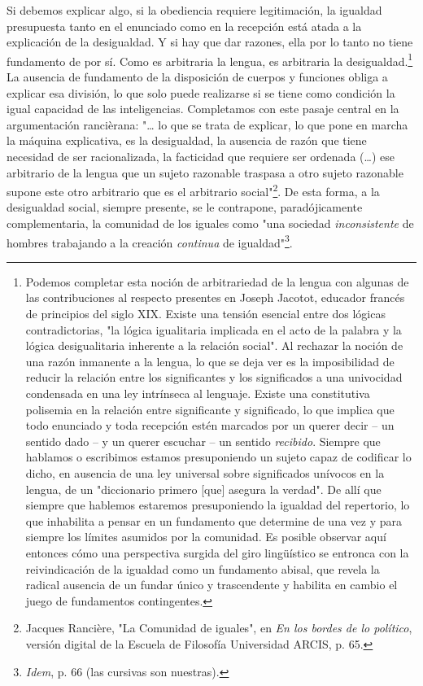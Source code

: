 Si debemos explicar algo, si la obediencia requiere legitimación, la
igualdad presupuesta tanto en el enunciado como en la recepción está
atada a la explicación de la desigualdad. Y si hay que dar razones, ella
por lo tanto no tiene fundamento de por sí. Como es arbitraria la
lengua, es arbitraria la desigualdad.\footnote{Podemos completar esta
  noción de arbitrariedad de la lengua con algunas de las contribuciones
  al respecto presentes en Joseph Jacotot, educador francés de
  principios del siglo XIX. Existe una tensión esencial entre dos
  lógicas contradictorias, "la lógica igualitaria implicada en el acto
  de la palabra y la lógica desigualitaria inherente a la relación
  social". Al rechazar la noción de una razón inmanente a la lengua, lo
  que se deja ver es la imposibilidad de reducir la relación entre los
  significantes y los significados a una univocidad condensada en una
  ley intrínseca al lenguaje. Existe una constitutiva polisemia en la
  relación entre significante y significado, lo que implica que todo
  enunciado y toda recepción estén marcados por un querer decir -- un
  sentido dado -- y un querer escuchar -- un sentido \emph{recibido}.
  Siempre que hablamos o escribimos estamos presuponiendo un sujeto
  capaz de codificar lo dicho, en ausencia de una ley universal sobre
  significados unívocos en la lengua, de un "diccionario primero
  {[}que{]} asegura la verdad". De allí que siempre que hablemos
  estaremos presuponiendo la igualdad del repertorio, lo que inhabilita
  a pensar en un fundamento que determine de una vez y para siempre los
  límites asumidos por la comunidad. Es posible observar aquí entonces
  cómo una perspectiva surgida del giro lingüístico se entronca con la
  reivindicación de la igualdad como un fundamento abisal, que revela la
  radical ausencia de un fundar único y trascendente y habilita en
  cambio el juego de fundamentos contingentes.} La ausencia de
fundamento de la disposición de cuerpos y funciones obliga a explicar
esa división, lo que solo puede realizarse si se tiene como condición la
igual capacidad de las inteligencias. Completamos con este pasaje
central en la argumentación rancièrana: "\ldots{} lo que se trata de
explicar, lo que pone en marcha la máquina explicativa, es la
desigualdad, la ausencia de razón que tiene necesidad de ser
racionalizada, la facticidad que requiere ser ordenada (\dots) ese
arbitrario de la lengua que un sujeto razonable traspasa a otro sujeto
razonable supone este otro arbitrario que es el arbitrario
social"\footnote{Jacques Rancière, "La Comunidad de iguales", en
  \emph{En los bordes de lo político}, versión digital de la Escuela de
  Filosofía Universidad ARCIS, p. 65.}. De esta forma, a la desigualdad
social, siempre presente, se le contrapone, paradójicamente
complementaria, la comunidad de los iguales como "una sociedad
\emph{inconsistente} de hombres trabajando a la creación \emph{continua}
de igualdad"\footnote{\emph{Idem}, p. 66 (las cursivas son nuestras).}.

